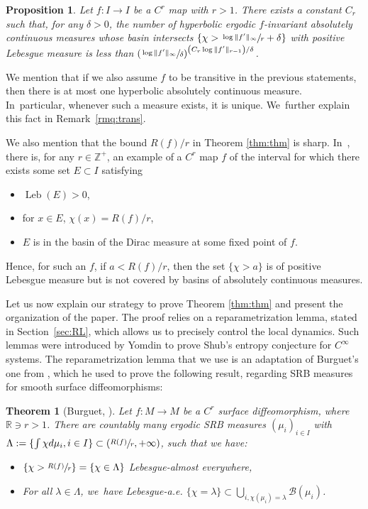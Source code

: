 \documentclass[JEP,XML,SOM,Unicode,NoFloatCountersInSection,published]{cedram}
\DeclareMathOperator{\Leb}{Leb}
\let\rC C
\newtheorem*{thm*}{Theorem}
\newtheorem{proptitle}[thmtitle]{Proposition}
\theoremstyle{definition}
\newcommand{\bbR}{{\mathbb{R}}}
\newcommand{\bbZ}{{\mathbb{Z}}}
\begin{document}
\begin{proptitle}
\label{prop:title}
Let $f : I \to I$ be a $\rC^r$ map with $r > 1$.
There exists a constant $C_r$ such that, for any $\delta > 0$, the number of hyperbolic ergodic $f$\nobreakdash-invariant absolutely continuous measures whose basin intersects $\left \{ \chi > \sfrac{\log \| f' \|_{\infty}}{r} + \delta \right \}$
with positive Lebesgue measure is less than
$
\left (\sfrac{\log \| f' \|_{\infty}}{\delta} \right)^{\left (C_r \log \| f' \|_{r-1} \right) / \delta}
$.
\end{proptitle}

We mention that if we also assume $f$ to be transitive in the previous statements, then there is at most one hyperbolic absolutely continuous measure. In~particular, whenever such a measure exists, it is unique. We~further explain this fact in Remark~\ref{rmq:trans}.

We also mention that the bound $R(f) /r$ in Theorem \ref{thm:thm} is sharp. In~\cite[App.\,A]{BurguetCMP}, there is, for any $r \in \bbZ^+$, an example of a $\rC^r$ map $f$ of the interval for which there exists some set $E \subset I$ satisfying
\begin{itemize}
\item
$\Leb(E) > 0$,
\item
for $x \in E$, $\chi(x) = R(f) / r$,
\item
$E$ is in the basin of the Dirac measure at some fixed point of $f$.
\end{itemize}
Hence, for such an $f$, if $a < R(f) / r$, then the set $\{ \chi > a \}$ is of positive Lebesgue measure but is not covered by basins of absolutely continuous measures.

Let us now explain our strategy to prove Theorem \ref{thm:thm} and present the organization of the paper.
The proof relies on a reparametrization lemma, stated in Section~\ref{sec:RL}, which allows us to precisely control the local dynamics.
Such lemmas were introduced by Yomdin \cite{Yomdin1987VolumeGA} to prove Shub's entropy conjecture for $\rC^{\infty}$ systems.
The reparametrization lemma that we use is an adaptation of Burguet's one from \cite{MR4701884}, which he used to prove the following result, regarding SRB measures for smooth surface diffeomorphisms:

\begin{thm*}[Burguet, \cite{MR4701884}]
Let $f: M \to M$ be a $\rC^r$ surface diffeomorphism, where $\bbR \ni r > 1$.
There are countably many ergodic SRB measures $(\mu_i)_{i \in I}$ with $\Lambda := \{ \int \chi d \mu_i, i \in I \} \subset \left (\sfrac{R(f)}{r}, + \infty \right)$, such that we have:
\begin{itemize}
\item
$\left \{ \chi > \sfrac{R(f)}{r} \right \} = \{ \chi \in \Lambda \}$ Lebesgue-almost everywhere,
\item
For all $\lambda \in \Lambda$, we~have Lebesgue-a.e. $\{ \chi = \lambda \} \subset \bigcup_{i, \chi(\mu_i) = \lambda} \mathcal{B}(\mu_i)$.
\end{itemize}
\end{thm*}
\end{document}
